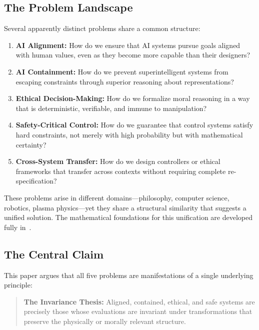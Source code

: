 \documentclass[12pt]{article}
\begin{document}
\subsection{The Problem Landscape}

Several apparently distinct problems share a common structure:

\begin{enumerate}
    \item \textbf{AI Alignment:} How do we ensure that AI systems pursue goals aligned with human values, even as they become more capable than their designers?

    \item \textbf{AI Containment:} How do we prevent superintelligent systems from escaping constraints through superior reasoning about representations?

    \item \textbf{Ethical Decision-Making:} How do we formalize moral reasoning in a way that is deterministic, verifiable, and immune to manipulation?

    \item \textbf{Safety-Critical Control:} How do we guarantee that control systems satisfy hard constraints, not merely with high probability but with mathematical certainty?

    \item \textbf{Cross-System Transfer:} How do we design controllers or ethical frameworks that transfer across contexts without requiring complete re-specification?
\end{enumerate}

These problems arise in different domains---philosophy, computer science, robotics, plasma physics---yet they share a structural similarity that suggests a unified solution. The mathematical foundations for this unification are developed fully in~\cite{bond2026ge}.

\subsection{The Central Claim}

This paper argues that all five problems are manifestations of a single underlying principle:

\begin{quote}
\textbf{The Invariance Thesis:} Aligned, contained, ethical, and safe systems are precisely those whose evaluations are invariant under transformations that preserve the physically or morally relevant structure.
\end{quote}
\end{document}
